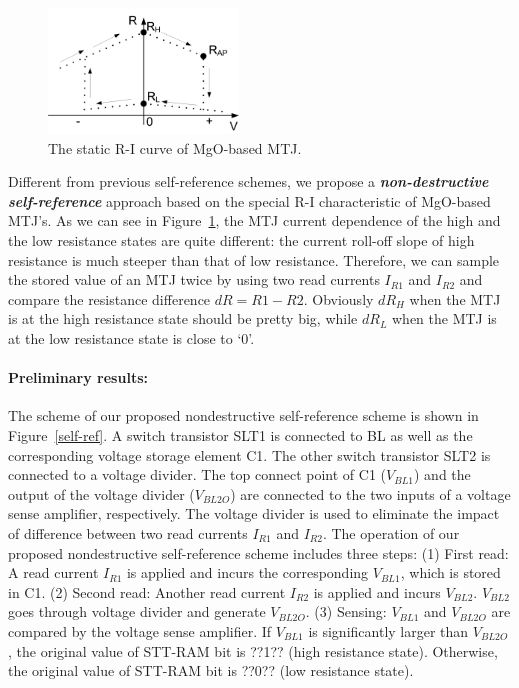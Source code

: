 \begin{figure}\centering \centering
\vspace{-18pt}
\includegraphics[width=0.45\textwidth]{./figure/RIcurve.pdf}
\caption{The static R-I curve of MgO-based MTJ.}\label{mtj-RI}
\end{figure}

Different from previous self-reference schemes, we propose a \textbf{\textit{non-destructive self-reference}} approach based on the special R-I characteristic of MgO-based MTJ's. As we can see in Figure~\ref{mtj-RI}, the MTJ current dependence of the high and the low resistance states are quite different: the current roll-off slope of high resistance is much steeper than that of low resistance. Therefore, we can sample the stored value of an MTJ twice by using two read currents $I_{R1}$ and $I_{R2}$ and compare the resistance difference $dR=R1-R2$. Obviously $dR_H$ when the MTJ is at the high resistance state should be pretty big, while $dR_L$ when the MTJ is at the low resistance state is close to `0'.

\paragraph{Preliminary results:} The scheme of our proposed nondestructive self-reference scheme is shown in Figure~\ref{self-ref}. A switch transistor SLT1 is connected to BL as well as the corresponding voltage storage element C1. The other switch transistor SLT2 is connected to a voltage divider. The top connect point of C1 ($V_{BL1}$) and the output of the voltage divider ($V_{BL2O}$) are connected to the two inputs of a voltage sense amplifier, respectively. The voltage divider is used to eliminate the impact of difference between two read currents $I_{R1}$ and $I_{R2}$. The operation of our proposed nondestructive self-reference scheme includes three steps: (1) First read: A read current $I_{R1}$ is applied and incurs the corresponding $V_{BL1}$, which is stored in C1. (2) Second read: Another read current $I_{R2}$ is applied and incurs $V_{BL2}$. $V_{BL2}$ goes through voltage divider and generate $V_{BL2O}$. (3) Sensing: $V_{BL1}$ and $V_{BL2O}$ are compared by the voltage sense amplifier. If $V_{BL1}$ is significantly larger than $V_{BL2O}$, the original value of STT-RAM bit is ??1?? (high resistance state). Otherwise, the original value of STT-RAM bit is ??0?? (low resistance state).

